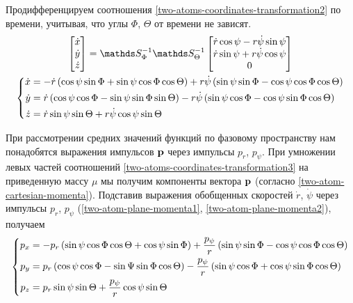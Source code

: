 Продифференцируем соотношения \eqref{two-atoms-coordinates-transformation2} по времени, учитывая, что углы $\Phi$, $\Theta$ от времени не зависят.
\begin{gather}
    \begin{bmatrix} \dot{x} \\ \dot{y} \\ \dot{z} \end{bmatrix} = 
    \bbS_\Phi^{-1} \bbS_\Theta^{-1}
    \begin{bmatrix} 
        \dot{r} \cos \psi - r \dot{\psi} \sin \psi \\
        \dot{r} \sin \psi + r \dot{\psi} \cos \psi \\
        0 
    \end{bmatrix} \\
    \lc
    \begin{aligned}
        \dot{x} &= - \dot{r} \lb \cos \psi \sin \Phi + \sin \psi \cos \Phi \cos \Theta \rb + r \dot{\psi} \lb \sin \psi \sin \Phi - \cos \psi \cos \Phi \cos \Theta \rb \\ 
        \dot{y} &= \dot{r} \lb \cos \psi \cos \Phi - \sin \psi \sin \Phi \sin \Theta \rb - r \dot{\psi} \lb \sin \psi \cos \Phi - \cos \psi \sin \Phi \cos \Theta \rb \\
        \dot{z} &= \dot{r} \sin \psi \sin \Theta + r \dot{\psi} \cos \psi \sin \Theta
    \end{aligned}
\right. \label{two-atoms-coordinates-transformation3}
\end{gather}

При рассмотрении средних значений функций по фазовому пространству нам понадобятся выражения импульсов $\mathbf{p}$ через импульсы $p_r$, $p_\psi$. При умножении левых частей соотношений \eqref{two-atoms-coordinates-transformation3} на приведенную массу $\mu$ мы получим компоненты вектора $\mathbf{p}$ (согласно \eqref{two-atom-cartesian-momenta}). Подставив выражения обобщенных скоростей $\dot{r}$, $\dot{\psi}$ через импульсы $p_r$, $p_\psi$ (\eqref{two-atom-plane-momenta1}, \eqref{two-atom-plane-momenta2}), получаем
\begin{gather}
    \left\{
    \begin{aligned}
        p_x &= -p_r \left( \sin \psi \cos \Phi \cos \Theta + \cos \psi \sin \Phi \right) + \frac{p_\psi}{r} \left( \sin \psi \sin \Phi - \cos \psi \cos \Phi \cos \Theta \right) \\
        p_y &= p_r \left( \cos \psi \cos \Phi - \sin \Psi \sin \Phi \cos \Theta \right) - \frac{p_\psi}{r} \left( \sin \psi \cos \Phi + \cos \psi \sin \Phi \cos \Theta \right) \\
        p_z &= p_r \sin \psi \sin \Theta + \frac{p_\psi}{r} \cos \psi \sin \Theta 
    \end{aligned}
\right. \label{two-atom-momenta-transformation}
\end{gather}

